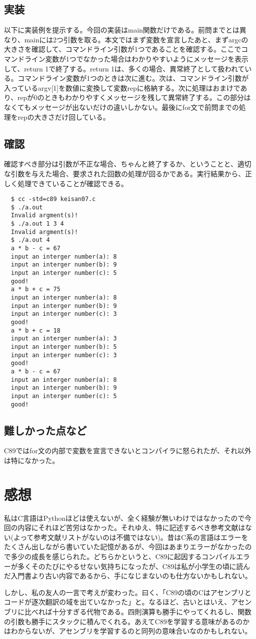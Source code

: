 \documentclass[dvipdfmx,12pt,a4j]{jarticle}
\begin{document}
\subsection{実装}
以下に実装例を提示する。今回の実装はmain関数だけである。前問までとは異なり、mainには2つ引数を取る。本文ではまず変数を宣言したあと、まずargcの大きさを確認して、コマンドライン引数が1つであることを確認する。ここでコマンドライン変数が1つでなかった場合はわかりやすいようにメッセージを表示して、return 1で終了する。return 1は、多くの場合、異常終了として扱われている。コマンドライン変数が1つのときは次に進む。次は、コマンドライン引数が入っているargv[1]を数値に変換して変数repに格納する。次に処理はおまけであり、repが0のときもわかりやすくメッセージを残して異常終了する。この部分はなくてもメッセージが出ないだけの違いしかない。最後にfor文で前問までの処理をrepの大きさだけ回している。


\subsection{確認}
確認すべき部分は引数が不正な場合、ちゃんと終了するか、ということと、適切な引数を与えた場合、要求された回数の処理が回るかである。実行結果から、正しく処理できていることが確認できる。
\begin{verbatim}
  $ cc -std=c89 keisan07.c
  $ ./a.out
  Invalid argment(s)!
  $ ./a.out 1 3 4
  Invalid argment(s)!
  $ ./a.out 4
  a * b - c = 67
  input an interger number(a): 8
  input an interger number(b): 9
  input an interger number(c): 5
  good!
  a * b + c = 75
  input an interger number(a): 8
  input an interger number(b): 9
  input an interger number(c): 3
  good!
  a * b + c = 18
  input an interger number(a): 3
  input an interger number(b): 5
  input an interger number(c): 3
  good!
  a * b - c = 67
  input an interger number(a): 8
  input an interger number(b): 9
  input an interger number(c): 5
  good!
\end{verbatim}

\subsection{難しかった点など}
C89ではfor文の内部で変数を宣言できないとコンパイラに怒られたが、それ以外は特になかった。

\section{感想}
私はC言語はPythonほどは使えないが、全く経験が無いわけではなかったので今回の内容にそれほど苦労はなかった。それゆえ、特に記述するべき参考文献はない(よって参考文献リストがないのは不備ではない)。昔はC系の言語はエラーをたくさん出しながら書いていた記憶があるが、今回はあまりエラーがなかったので多少の成長を感じられた。どちらかというと、C89に起因するコンパイルエラーが多くそのたびにやるせない気持ちになったが、C89は私が小学生の頃に読んだ入門書より古い内容であるから、手になじまないのも仕方ないかもしれない。

しかし、私の友人の一言で考えが変わった。曰く、「C89の頃のCはアセンブリとコードが逐次翻訳の域を出ていなかった」と。なるほど、古いとはいえ、アセンブリに比べれば十分すぎる代物である。四則演算も勝手にやってくれるし、関数の引数も勝手にスタックに積んでくれる。あえてC89を学習する意味があるのかはわからないが、アセンブリを学習するのと同列の意味合いなのかもしれない。
\end{document}
